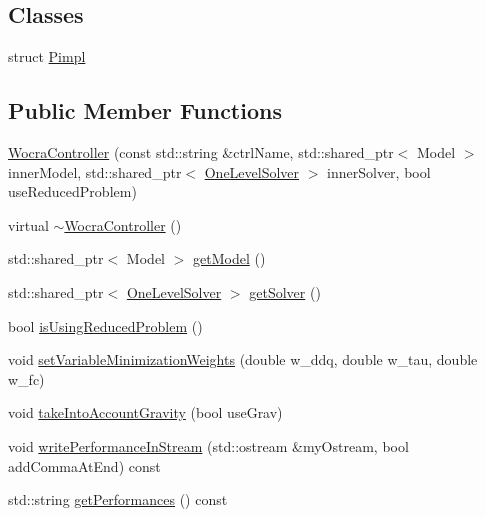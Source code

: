 \subsection*{Classes}
\begin{DoxyCompactItemize}
\item 
struct \hyperlink{structwocra_1_1WocraController_1_1Pimpl}{Pimpl}
\end{DoxyCompactItemize}
\subsection*{Public Member Functions}
\begin{DoxyCompactItemize}
\item 
\hyperlink{classwocra_1_1WocraController_ae14fda387f6d308aead6ab7a59e82e74}{Wocra\+Controller} (const std\+::string \&ctrl\+Name, std\+::shared\+\_\+ptr$<$ Model $>$ inner\+Model, std\+::shared\+\_\+ptr$<$ \hyperlink{classocra_1_1OneLevelSolver}{One\+Level\+Solver} $>$ inner\+Solver, bool use\+Reduced\+Problem)
\item 
virtual \hyperlink{classwocra_1_1WocraController_a4051d9aab485cfa444ed90da795f2bb2}{$\sim$\+Wocra\+Controller} ()
\item 
std\+::shared\+\_\+ptr$<$ Model $>$ \hyperlink{classwocra_1_1WocraController_adc7f78b5f888c76a3296cfd5882caad1}{get\+Model} ()
\item 
std\+::shared\+\_\+ptr$<$ \hyperlink{classocra_1_1OneLevelSolver}{One\+Level\+Solver} $>$ \hyperlink{classwocra_1_1WocraController_a94f67ee0ae6985969f4f1798bde0a9db}{get\+Solver} ()
\item 
bool \hyperlink{classwocra_1_1WocraController_a89eab1194e0598d8b30730429f286450}{is\+Using\+Reduced\+Problem} ()
\item 
void \hyperlink{classwocra_1_1WocraController_a23b01d7dad39803132d69ae335212615}{set\+Variable\+Minimization\+Weights} (double w\+\_\+ddq, double w\+\_\+tau, double w\+\_\+fc)
\item 
void \hyperlink{classwocra_1_1WocraController_a339cb7de07b9766aba4b3d1cfd6a78d4}{take\+Into\+Account\+Gravity} (bool use\+Grav)
\item 
void \hyperlink{classwocra_1_1WocraController_a9b296a995ba10ef66cc4416f34f4b675}{write\+Performance\+In\+Stream} (std\+::ostream \&my\+Ostream, bool add\+Comma\+At\+End) const
\item 
std\+::string \hyperlink{classwocra_1_1WocraController_a4023613cae33e5f490babbc6d162204d}{get\+Performances} () const
\item 

\end{DoxyCompactItemize}
